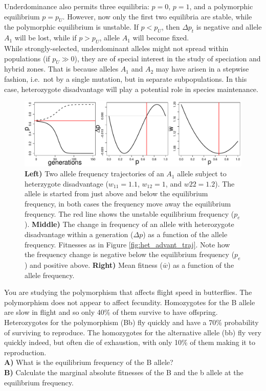Underdominance also permits three equilibria: $p=0$, $p=1$, and a
polymorphic equilibrium $p=p_U$. However, now only the first two equilibria are stable, while the polymorphic
equilibrium is unstable. If $p<p_U$, then $\Delta p_t $ is negative
and allele $A_1$ will be lost, while if $p>p_U$, allele
$A_1$ will become fixed.\\


While strongly-selected, underdominant alleles might not spread within populations (if $p_U \gg
0$), they are of special interest in the study of speciation and hybrid zones. That is because alleles $A_1$
and $A_2$ may have arisen in a stepwise fashion, i.e.\ not by a single
mutation,  but in separate subpopulations. In this case, heterozygote disadvantage will play a potential role in species maintenance.\\

      \begin{figure}
\begin{center}
  \includegraphics[width = 0.8 \textwidth]{figures/het_disadvant_dp_wbar.pdf}
\end{center}
\caption{
{\bf Left)} Two allele frequency trajectories of an $A_1$ allele subject to
  heterzygote disadvantage ($w_{11}=1.1$, $w_{12}=1$, and
  $w22=1.2$). The allele is started from just above and below the
  equilibrium frequency, in both cases the frequency move away the equilibrium frequency. The red line shows
the unstable equilibrium frequency ($p_e$). 
  {\bf Middle)} The change in frequency of an allele with heterozygote
  disadvantage within a generation ($\Delta p$) as a function of the allele
frequency. Fitnesses as in Figure \ref{fig:het_advant_traj}. Note how the frequency change is negative below the
equilibrium frequency ($p_e$) and positive above. {\bf Right)} Mean
fitness ($\bar{w}$) as a function of the allele frequency. } \label{fig:het_disadvant_dp_wbar}
\end{figure}

\begin{question}
You are studying the polymorphism that affects flight speed in butterflies. The polymorphism does not appear to affect fecundity.  Homozygotes for the B allele are slow in flight and so only 40\% of them survive to have offspring. Heterozygotes for the polymorphism (Bb) fly quickly and have a 70\% probability of surviving to reproduce. The homozygotes for the alternative allele (bb) fly very quickly indeed, but often die of exhaustion, with only 10\% of them making it to reproduction.  \\
{\bf A)} What is the equilibrium frequency of the B allele?\\
{\bf B)} Calculate the marginal absolute fitnesses of the B and the b allele at the equilibrium frequency. 
\end{question}


